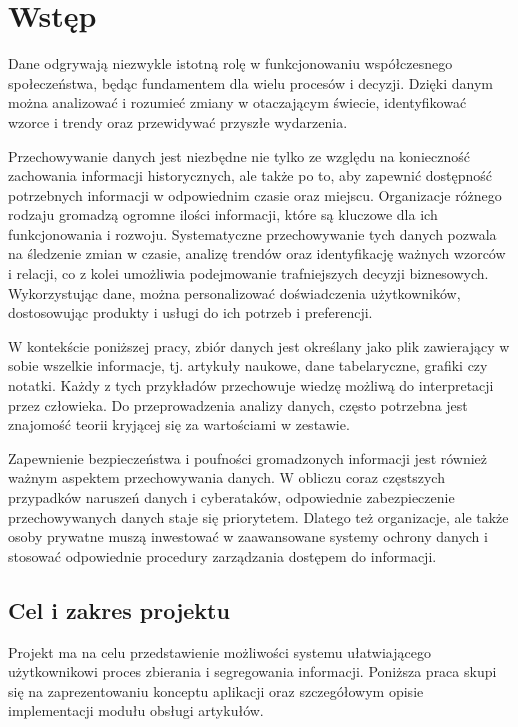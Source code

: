 \documentclass[12pt,a4paper,twoside]{article}
\begin{document}
\section*{Wstęp}
Dane odgrywają niezwykle istotną rolę w funkcjonowaniu współczesnego społeczeństwa, będąc fundamentem dla wielu procesów i decyzji. Dzięki danym można analizować i rozumieć zmiany w otaczającym świecie, identyfikować wzorce i trendy oraz przewidywać przyszłe wydarzenia.\par
Przechowywanie danych jest niezbędne nie tylko ze względu na konieczność zachowania informacji historycznych, ale także po to, aby zapewnić dostępność potrzebnych informacji w odpowiednim czasie oraz miejscu. Organizacje różnego rodzaju gromadzą ogromne ilości informacji, które są kluczowe dla ich funkcjonowania i rozwoju. Systematyczne przechowywanie tych danych pozwala na śledzenie zmian w czasie, analizę trendów oraz identyfikację ważnych wzorców i relacji, co z kolei umożliwia podejmowanie trafniejszych decyzji biznesowych. Wykorzystując dane, można personalizować doświadczenia użytkowników, dostosowując produkty i usługi do ich potrzeb i preferencji.\par
W kontekście poniższej pracy, zbiór danych jest określany jako plik zawierający w sobie wszelkie informacje, tj. artykuły naukowe, dane tabelaryczne, grafiki czy notatki. Każdy z tych przykładów przechowuje wiedzę możliwą do interpretacji przez człowieka. Do przeprowadzenia analizy danych, często potrzebna jest znajomość teorii kryjącej się za wartościami w zestawie.\par
Zapewnienie bezpieczeństwa i poufności gromadzonych informacji jest również ważnym aspektem przechowywania danych. W obliczu coraz częstszych przypadków naruszeń danych i cyberataków, odpowiednie zabezpieczenie przechowywanych danych staje się priorytetem. Dlatego też organizacje, ale także osoby prywatne muszą inwestować w zaawansowane systemy ochrony danych i stosować odpowiednie procedury zarządzania dostępem do informacji.\par
\subsection*{Cel i zakres projektu}
Projekt ma na celu przedstawienie możliwości systemu ułatwiającego użytkownikowi proces zbierania i segregowania informacji. Poniższa praca skupi się na zaprezentowaniu konceptu aplikacji oraz szczegółowym opisie implementacji modułu obsługi artykułów.
\newpage
\end{document}
